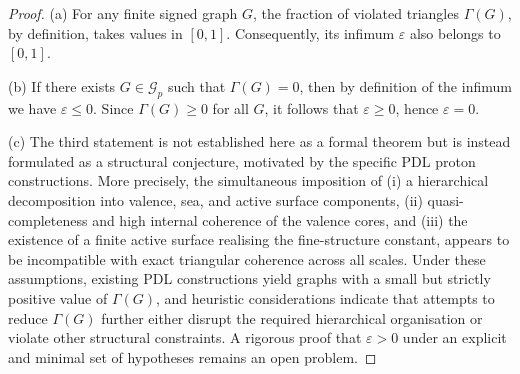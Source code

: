 \documentclass[11pt,a4paper]{article}
\theoremstyle{definition}
\begin{document}
\begin{proof}
(a) For any finite signed graph $G$, the fraction of violated triangles $\Gamma(G)$, by definition, takes values in $[0,1]$. Consequently, its infimum $\varepsilon$ also belongs to $[0,1]$.\cite{PDL_Main_2026,Harary1953}

(b) If there exists $G\in\mathcal{G}_p$ such that $\Gamma(G)=0$, then by definition of the infimum we have $\varepsilon\leq 0$. Since $\Gamma(G)\geq 0$ for all $G$, it follows that $\varepsilon\geq 0$, hence $\varepsilon=0$.

(c) The third statement is not established here as a formal theorem but is instead formulated as a structural conjecture, motivated by the specific PDL proton constructions.\cite{Combinatorial_Proton_v2_2026,Exponent_18_PDL_2026} More precisely, the simultaneous imposition of (i) a hierarchical decomposition into valence, sea, and active surface components, (ii) quasi-completeness and high internal coherence of the valence cores, and (iii) the existence of a finite active surface realising the fine-structure constant, appears to be incompatible with exact triangular coherence across all scales.\cite{Combinatorial_Proton_v2_2026,Alpha_PDL_v2_2026,Topological_Reformulation_PDL_2026} Under these assumptions, existing PDL constructions yield graphs with a small but strictly positive value of $\Gamma(G)$, and heuristic considerations indicate that attempts to reduce $\Gamma(G)$ further either disrupt the required hierarchical organisation or violate other structural constraints.\cite{Exponent_18_PDL_2026,PDL_Global_Mapping_2026} A rigorous proof that $\varepsilon>0$ under an explicit and minimal set of hypotheses remains an open problem.
\end{proof}
\end{document}
